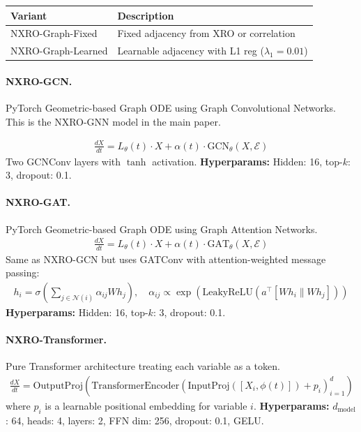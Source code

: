 \begin{tabular}{@{}ll@{}}
\textbf{Variant} & \textbf{Description} \\
\hline
NXRO-Graph-Fixed & Fixed adjacency from XRO or correlation \\
NXRO-Graph-Learned & Learnable adjacency with L1 reg ($\lambda_1 = 0.01$) \\
\end{tabular}

\paragraph{NXRO-GCN.}
PyTorch Geometric-based Graph ODE using Graph Convolutional Networks. This is the NXRO-GNN model in the main paper.

\begin{align*}
    \frac{dX}{dt} = L_\theta(t) \cdot X + \alpha(t) \cdot \text{GCN}_\theta(X, \mathcal{E})
\end{align*}
Two GCNConv layers with $\tanh$ activation. \textbf{Hyperparams:} Hidden: 16, top-$k$: 3, dropout: 0.1.

\paragraph{NXRO-GAT.}
PyTorch Geometric-based Graph ODE using Graph Attention Networks.
\begin{align*}
    \frac{dX}{dt} = L_\theta(t) \cdot X + \alpha(t) \cdot \text{GAT}_\theta(X, \mathcal{E})
\end{align*}
Same as NXRO-GCN but uses GATConv with attention-weighted message passing:
\begin{align*}
    h_i = \sigma\left(\sum_{j \in \mathcal{N}(i)} \alpha_{ij} W h_j\right), \quad \alpha_{ij} \propto \exp(\text{LeakyReLU}(a^\top [Wh_i \| Wh_j]))
\end{align*}
\textbf{Hyperparams:} Hidden: 16, top-$k$: 3, dropout: 0.1.

\paragraph{NXRO-Transformer.}
Pure Transformer architecture treating each variable as a token.
\begin{align*}
    \frac{dX}{dt} = \text{OutputProj}\left(\text{TransformerEncoder}\left(\text{InputProj}([X_i, \phi(t)]) + p_i\right)_{i=1}^d\right)
\end{align*}
where $p_i$ is a learnable positional embedding for variable $i$.
\textbf{Hyperparams:} $d_{\text{model}}$: 64, heads: 4, layers: 2, FFN dim: 256, dropout: 0.1, GELU.

